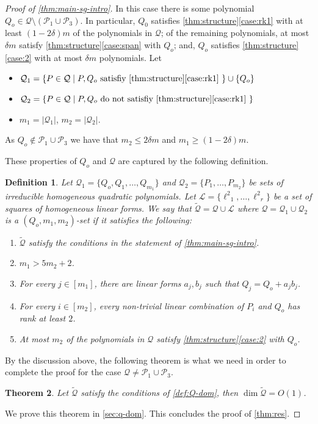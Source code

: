 \documentclass[10pt,a4paper]{article}
\newtheorem{theorem}{Theorem}
\newtheorem{definition}[theorem]{Definition}
\newcommand{\calL}{{\mathcal{L}}}
\newcommand{\cQ}{{\mathcal{Q}}}
\newcommand{\calP}{{\mathcal{P}}}
\newcommand{\MVar}[2]{{#1}_1,\ldots, {#1}_{#2}}
\begin{document}
\begin{proof}[Proof of \autoref{thm:main-sg-intro}]
In this case there is some polynomial $Q_o \in \cQ \setminus ({\calP}_1\cup {\calP}_3)$. In particular,  $Q_0$ satisfies \autoref{thm:structure}\ref{case:rk1} with at least $(1-2\delta)m$ of the polynomials in $\cQ$; of the remaining polynomials, at most $\delta m$ satisfy \autoref{thm:structure}\ref{case:span} with $Q_o$; 
and, $Q_o$ satisfies \autoref{thm:structure}\ref{case:2} with at most $\delta m$ polynomials.
 Let 
\begin{itemize}
\item $\cQ_1 =  \{P \in \cQ \mid P,Q_o \text{ satisfiy \autoref{thm:structure}\ref{case:rk1} }\} \cup \{Q_o\}$
\item $\cQ_2 = \{P \in \cQ \mid P,Q_o \text{ do not satisfiy \autoref{thm:structure}\ref{case:rk1} }\}$ 
\item $m_1 = |\cQ_1|$, $m_2 = |\cQ_2|$.
\end{itemize}
As $Q_o \notin \calP_1 \cup \calP_3$ we have that $m_2 \leq 2\delta m$ and $m_1 \geq (1-2\delta)m$.

These properties of $Q_o$ and $\cQ$ are captured by the following definition.

\begin{definition}\label{def:Q-dom}
Let  $\mathcal{Q}_1 = \{Q_o,Q_1,\ldots,Q_{m_1}\}$ and $\mathcal{Q}_2 = \{\MVar{P}{m_2}\}$ be sets of irreducible homogeneous quadratic polynomials. Let $\calL = \{\MVar{\ell^2}{r}\}$ be a set of squares of homogeneous linear forms. We say that $\tilde{\cQ} = \cQ \cup \calL$ where $\cQ=\cQ_1\cup\cQ_2$ is a {$(Q_o,m_1,m_2)$-set} if it satisfies the following:
\begin{enumerate}
\item $\tilde{\cQ}$ satisfy the conditions in the statement of \autoref{thm:main-sg-intro}.
\item $m_1 > 5m_2+2$.

\item For every $j\in [m_1]$, there are  linear forms $a_j,b_j$ such that  $Q_j = Q_o + a_j b_j$.
\item For every $i\in [m_2]$, every non-trivial linear combination of $P_i$ and $Q_o$ has rank at least $2$.\label{item:Qdom>2}
\item At most $m_2$ of the polynomials in $\cQ$  satisfy \autoref{thm:structure}\ref{case:2} with $Q_o$. \label{item:Qdom-case3}
\end{enumerate}
\end{definition}

By the discussion above, the following theorem is what we need in order to complete the proof for the case   $\cQ\neq\calP_1\cup\calP_3$.

\begin{theorem}\label{thm:Q-dom-gen}
Let $\tilde{\cQ}$ satisfy the conditions of \autoref{def:Q-dom}, then $\dim{\tilde{\cQ}} = O(1)$.
\end{theorem}

We prove this theorem in \autoref{sec:q-dom}. This concludes the proof of \autoref{thm:res}. 
\end{proof}
\end{document}
